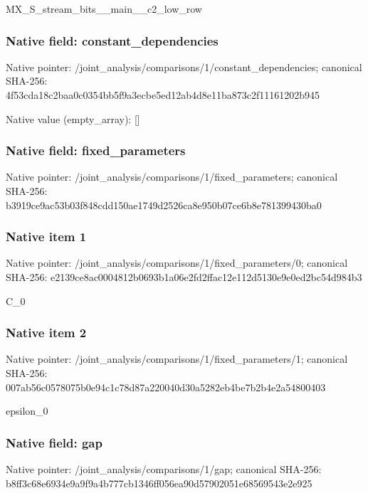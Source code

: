 \documentclass[10pt,a4paper]{article}
\begin{document}
\begingroup\raggedright\sloppy MX\_\allowbreak{}S\_\allowbreak{}stream\_\allowbreak{}bits\_\allowbreak{}\_\allowbreak{}main\_\allowbreak{}\_\allowbreak{}c2\_\allowbreak{}low\_\allowbreak{}row\par\endgroup

\subsubsection{Native field: constant\_\allowbreak{}dependencies}
Native pointer: /joint\_\allowbreak{}analysis/comparisons/1/constant\_\allowbreak{}dependencies; canonical SHA-256: 4f53cda18c2baa0c0354bb5f9a3ecbe5ed12ab4d8e11ba873c2f11161202b945

Native value (empty\_\allowbreak{}array): []

\subsubsection{Native field: fixed\_\allowbreak{}parameters}
Native pointer: /joint\_\allowbreak{}analysis/comparisons/1/fixed\_\allowbreak{}parameters; canonical SHA-256: b3919ce9ac53b03f848cdd150ae1749d2526ca8e950b07ce6b8e781399430ba0

\subsubsection{Native item 1}
Native pointer: /joint\_\allowbreak{}analysis/comparisons/1/fixed\_\allowbreak{}parameters/0; canonical SHA-256: e2139ce8ac0004812b0693b1a06e2fd2ffac12e112d5130e9e0ed2bc54d984b3

\begingroup\raggedright\sloppy C\_\allowbreak{}0\par\endgroup

\subsubsection{Native item 2}
Native pointer: /joint\_\allowbreak{}analysis/comparisons/1/fixed\_\allowbreak{}parameters/1; canonical SHA-256: 007ab56c0578075b0e94c1c78d87a220040d30a5282eb4be7b2b4e2a54800403

\begingroup\raggedright\sloppy epsilon\_\allowbreak{}0\par\endgroup

\subsubsection{Native field: gap}
Native pointer: /joint\_\allowbreak{}analysis/comparisons/1/gap; canonical SHA-256: b8ff3c68e6934e9a9f9a4b777cb1346ff056ea90d57902051e68569543e2e925
\end{document}
